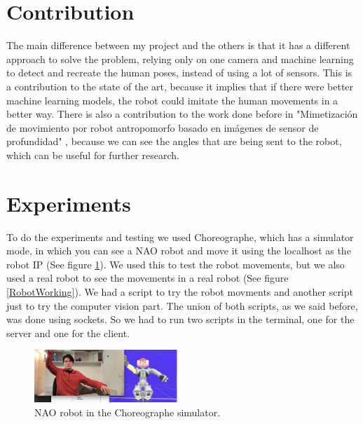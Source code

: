 \documentclass[conference]{IEEEtran}
\begin{document}
\section{Contribution}
The main difference between my project and the others is that it has a different approach to solve the problem, relying only on one camera and machine learning to detect and recreate the human poses, instead of using a lot of sensors. This is a contribution to the state of the art, because it implies that if there were better machine learning models, the robot could imitate the human movements in a better way. 
There is also a contribution to the work done before in "Mimetización de movimiento por robot antropomorfo basado en imágenes de sensor de profundidad" \cite{b3}, because we can see the angles that are being sent to the robot, which can be useful for further research.


\section{Experiments}
To do the experiments and testing we used Choreographe, which has a simulator mode, in which you can see a NAO robot and move it using the localhost as the robot IP (See figure \ref{RobotSimulation}). We used this to test the robot movements, but we also used a real robot to see the movements in a real robot (See figure \ref{RobotWorking}).
We had a script to try the robot movments and another script just to try the computer vision part. The union of both scripts, as we said before, was done using sockets. So we had to run two scripts in the terminal, one for the server and one for the client.
\begin{figure}[htbp]
\centerline{\includegraphics[width=0.48\textwidth]{images/RobotSimulation.png}}
\caption{NAO robot in the Choreographe simulator.}
\label{RobotSimulation}
\end{figure}
\end{document}
